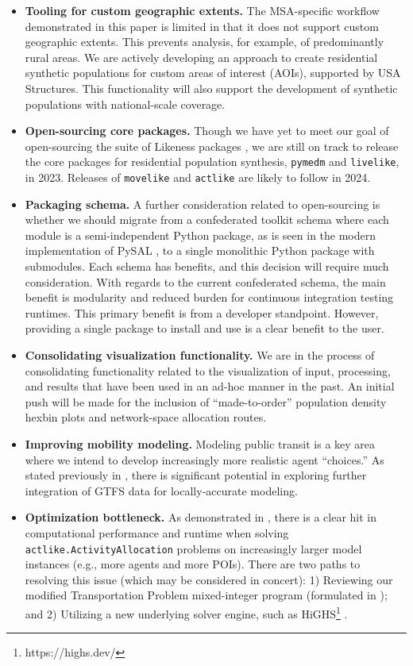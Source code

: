 \begin{itemize}
    \item \textbf{Tooling for custom geographic extents.} The MSA-specific workflow demonstrated in this paper is limited in that it does not support custom geographic extents. This prevents analysis, for example, of predominantly rural areas. 
    We are actively developing an approach to create residential synthetic populations for custom areas of interest (AOIs), supported by USA Structures. This functionality will also support the development of synthetic populations with national-scale coverage.
    \item \textbf{Open-sourcing core packages.} Though we have yet to meet our goal of open-sourcing the suite of Likeness packages \cite{likeness-scipy-paper-2022}, we are still on track to release the core packages for residential population synthesis, \texttt{pymedm} and \texttt{livelike}, in 2023. Releases of \texttt{movelike} and \texttt{actlike} are likely to follow in 2024.
    \item \textbf{Packaging schema.} A further consideration related to open-sourcing is whether we should migrate from a confederated toolkit schema where each module is a semi-independent Python package, as is seen in the modern implementation of PySAL \cite{pysal_GA_2022}, to a single monolithic Python package with submodules. Each schema has benefits, and this decision will require much consideration. With regards to the current confederated schema, the main benefit is modularity and reduced burden for continuous integration testing runtimes. This primary benefit is from a developer standpoint. However, providing a single package to install and use is a clear benefit to the user.
    \item \textbf{Consolidating visualization functionality.} We are in the process of consolidating functionality related to the visualization of input, processing, and results that have been used in an ad-hoc manner in the past. An initial push will be made for the inclusion of ``made-to-order'' population density hexbin plots and network-space allocation routes.
    \item \textbf{Improving mobility modeling.} Modeling public transit is a key area where we intend to develop increasingly more realistic agent ``choices.'' As stated previously in , there is significant potential in exploring further integration of GTFS data for locally-accurate modeling.
    \item \textbf{Optimization bottleneck.} As demonstrated in , there is a clear hit in computational performance and runtime when solving  \texttt{actlike.ActivityAllocation} problems on increasingly larger model instances (e.g., more agents and more POIs). There are two paths to resolving this issue (which may be considered in concert): 1) Reviewing our modified Transportation Problem mixed-integer program (formulated in \cite{likeness-scipy-paper-2022}); and 2) Utilizing a new underlying solver engine, such as HiGHS\footnote{https://highs.dev/} \cite{highs_mpc_2018}.

\end{itemize}
